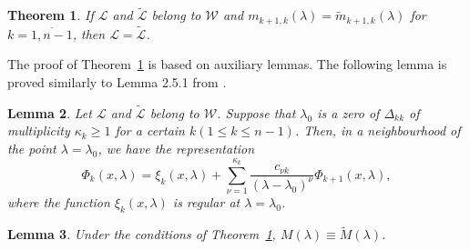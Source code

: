\documentclass[reqno,12pt,centertags]{amsart}
\numberwithin{equation}{section}
\newtheorem{theorem}{Theorem}[section]
\newtheorem{lemma}[theorem]{Lemma}
\theoremstyle{definition}
\begin{document}
\begin{theorem}\label{mfun}
	If $\mathcal L$ and $\tilde{\mathcal L}$ belong to $\mathcal{W}$ and $m_{k+1,k}(\lambda)=\tilde{m}_{k+1,k}(\lambda)$ for $k=\overline{1,n-1}$,
	then $\mathcal L=\tilde {\mathcal L}$.
\end{theorem}

The proof of Theorem~\ref{mfun} is based on auxiliary lemmas. The following lemma is proved similarly to Lemma 2.5.1 from \cite{Yur}.

\begin{lemma}\label{Yurko}
Let $\mathcal L$ and $\tilde{\mathcal L}$ belong to $\mathcal{W}$. Suppose that $\lambda_{0}$ is a zero of $\Delta_{kk}$ of multiplicity $\kappa_k\geq 1$ for a certain $k$\;$(1\leq k\leq n-1)$. Then, in a neighbourhood of the point $\lambda=\lambda_0$, we have the representation
\begin{equation}\label{xi}
	\Phi_k(x, \lambda)=\xi_k(x, \lambda)+\sum_{\nu=1}^{\kappa_k} \frac{c_{\nu k}}{\left(\lambda-\lambda_0\right)^\nu} \Phi_{k+1}(x, \lambda),
\end{equation}
where the function $\xi_k(x, \lambda)$ is regular at $\lambda=\lambda_0$.
\end{lemma}

\begin{lemma} \label{lem:eqM}
Under the conditions of Theorem~\ref{mfun}, $M(\lambda) \equiv \tilde M(\lambda)$.
\end{lemma}
	
\end{document}
